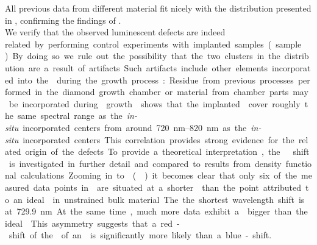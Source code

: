 	All previous data from different \nd material fit nicely with the \ZPL distribution presented in , confirming the findings of .
	\\
	We verify that the observed luminescent defects are indeed \si related by performing control experiments with \si implanted samples (sample \implantedTao).
	By doing so we rule out the possibility that the two clusters in the distribution are a result of artifacts.
	Such artifacts include other elements incorporated into the \nds during the growth process: Residue from previous processes performed in the diamond growth chamber or material from chamber parts may be incorporated during \nd growth.
	 shows that the implanted \sivs cover roughly the same spectral range as the \textit{in-situ} incorporated centers from around \SIrange{720}{820}{nm} as the \textit{in-situ} incorporated centers.
	This correlation provides strong evidence for the \si related origin of the defects.
	
	To provide a theoretical interpretation, the \ZPL \cwl shift is investigated in further detail and compared to results from density functional calculations.
	Zooming in to \vl () it becomes clear that only six of the measured data points in \vl are situated at a shorter \cwl than the point attributed to an ideal \siv in unstrained bulk material.
	The the shortest wavelength shift is at \SI{729.9}{nm}.
	At the same time, much more data exhibit a \cwl bigger than the ideal \siv.
	This asymmetry suggests that a red-shift of the \ZPL of an \siv is significantly more likely than a blue-shift.

